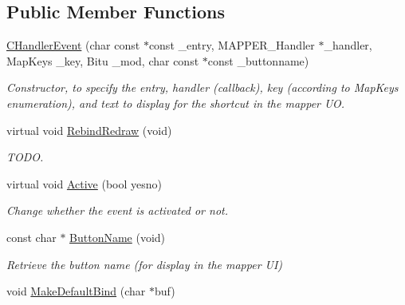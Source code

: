 \subsection*{Public Member Functions}
\begin{DoxyCompactItemize}
\item 
\hypertarget{classCHandlerEvent_aca304371826b35def368cb051ca7a625}{\hyperlink{classCHandlerEvent_aca304371826b35def368cb051ca7a625}{C\-Handler\-Event} (char const $\ast$const \-\_\-entry, M\-A\-P\-P\-E\-R\-\_\-\-Handler $\ast$\-\_\-handler, Map\-Keys \-\_\-key, Bitu \-\_\-mod, char const $\ast$const \-\_\-buttonname)}\label{classCHandlerEvent_aca304371826b35def368cb051ca7a625}

\begin{DoxyCompactList}\small\item\em Constructor, to specify the entry, handler (callback), key (according to Map\-Keys enumeration), and text to display for the shortcut in the mapper U\-O. \end{DoxyCompactList}\item 
\hypertarget{classCHandlerEvent_ab7999cce03d912c614a19eecce1875dc}{virtual void \hyperlink{classCHandlerEvent_ab7999cce03d912c614a19eecce1875dc}{Rebind\-Redraw} (void)}\label{classCHandlerEvent_ab7999cce03d912c614a19eecce1875dc}

\begin{DoxyCompactList}\small\item\em T\-O\-D\-O. \end{DoxyCompactList}\item 
\hypertarget{classCHandlerEvent_af4a0835bf174abb23ae9b88c0521e9c8}{virtual void \hyperlink{classCHandlerEvent_af4a0835bf174abb23ae9b88c0521e9c8}{Active} (bool yesno)}\label{classCHandlerEvent_af4a0835bf174abb23ae9b88c0521e9c8}

\begin{DoxyCompactList}\small\item\em Change whether the event is activated or not. \end{DoxyCompactList}\item 
\hypertarget{classCHandlerEvent_a58aafd6e482cff4b63507391d424477f}{const char $\ast$ \hyperlink{classCHandlerEvent_a58aafd6e482cff4b63507391d424477f}{Button\-Name} (void)}\label{classCHandlerEvent_a58aafd6e482cff4b63507391d424477f}

\begin{DoxyCompactList}\small\item\em Retrieve the button name (for display in the mapper U\-I) \end{DoxyCompactList}\item 
\hypertarget{classCHandlerEvent_a3062e41266603ad8918a7ca2bba8f095}{void \hyperlink{classCHandlerEvent_a3062e41266603ad8918a7ca2bba8f095}{Make\-Default\-Bind} (char $\ast$buf)}\label{classCHandlerEvent_a3062e41266603ad8918a7ca2bba8f095}


\end{DoxyCompactItemize}

